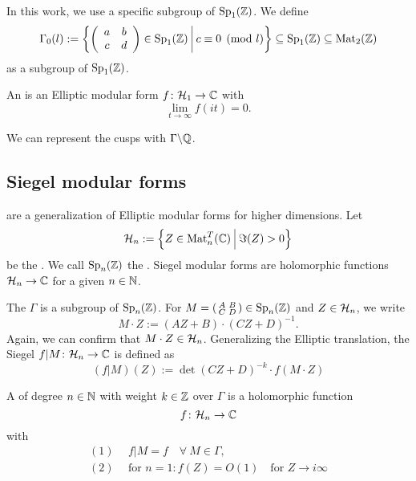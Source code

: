In this work, we use a specific subgroup of $\operatorname{Sp}_1(\mathbb{Z})$. We define
\[ \Gamma_0(l) := \Set{\SimpleMatrix{a}{b}{c}{d} \in \Sp_1(\Z)}{c \equiv 0 \pmod{l}} \subseteq \Sp_1(\Z) \subseteq \M_2(\Z) \]
as a subgroup of $\operatorname{Sp}_1(\mathbb{Z})$.

An  is an Elliptic modular form $f \colon \mathcal{H}_1 \rightarrow \mathbb{C}$ with
\[ \lim_{t \rightarrow \infty} f(i t) = 0 . \]

We can represent the cusps with $\Gamma \backslash \mathbb{Q}$.



\subsection{Siegel modular forms}

 are a generalization of Elliptic modular forms for higher dimensions.
Let
\[ \SiegelHalfPlane_n := \Set{Z \in \M_n^T(\C)}{\Im(Z) > 0} \]
be the .
We call $\operatorname{Sp}_n(\mathbb{Z})$ the .
Siegel modular forms are holomorphic functions $\mathcal{H}_n \rightarrow \mathbb{C}$ for a given  $n \in \mathbb{N}$.

The  $\Gamma$ is a subgroup of $\operatorname{Sp}_n(\mathbb{Z})$. For $M = \left( \begin{smallmatrix} A & B \\ C & D \end{smallmatrix} \right) \in \operatorname{Sp}_n(\mathbb{Z})$ and $Z \in \mathcal{H}_n$, we write
\[ M \cdot Z := (A Z + B) \cdot (C Z + D)^{-1} . \]
Again, we can confirm that $M\cdot Z \in \mathcal{H}_n$.
Generalizing the Elliptic translation, the Siegel  $f | M \colon \mathcal{H}_n \rightarrow \mathbb{C}$ is defined as   
\[ ( f | M ) (Z) :=
\det(CZ + D)^{-k} \cdot f(M \cdot Z) \]



A  of degree $n\in\mathbb{N}$ with weight $k \in \mathbb{Z}$ over $\Gamma$ is a holomorphic function
\[ f \colon \mathcal{H}_n \rightarrow \mathbb{C} \]
with
\begin{align*}
(1) \ \ & f|M = f \quad \forall \ M \in \Gamma, \\
(2) \ \ & \text{for } n = 1 \colon f(Z) = O(1) \quad \text{for } Z \rightarrow i \infty
\end{align*}

